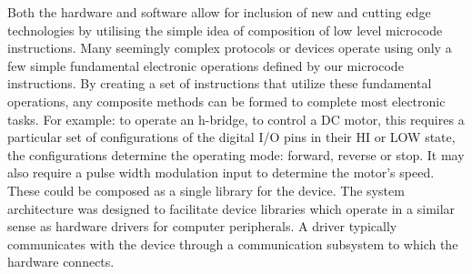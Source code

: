     
	Both the hardware and software allow for inclusion of new and cutting edge technologies by utilising the simple idea of composition of low level microcode instructions. Many seemingly complex protocols or devices operate using only a few simple fundamental electronic operations defined by our microcode instructions. By creating a set of instructions that utilize these fundamental operations, any composite methods can be formed to complete most electronic tasks. For example: to operate an h-bridge, to control a DC motor, this requires a particular set of configurations of the digital I/O pins in their HI or LOW state, the configurations determine the operating mode: forward, reverse or stop. It may also require a pulse width modulation input to determine the motor's speed. These could be composed as a single library for the device. The \xten system architecture was designed to facilitate device libraries which operate in a similar sense as hardware drivers for computer peripherals. A driver typically communicates with the device through a communication subsystem to which the hardware connects.	
	
	
	
	
